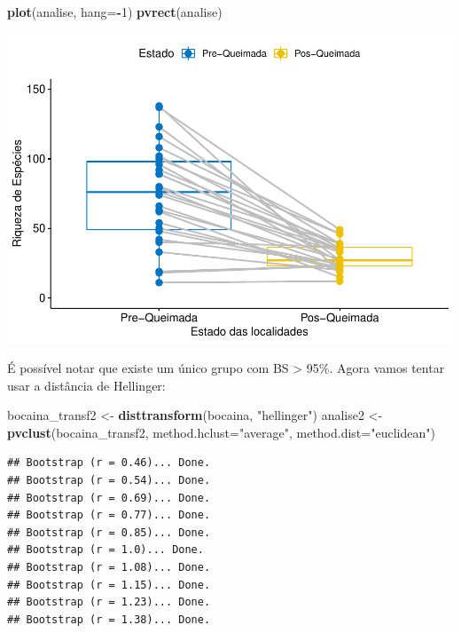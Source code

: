 \documentclass[
]{book}
\newenvironment{Shaded}{\begin{snugshade}}{\end{snugshade}}
\newcommand{\DataTypeTok}[1]{\textcolor[rgb]{0.13,0.29,0.53}{#1}}
\newcommand{\DecValTok}[1]{\textcolor[rgb]{0.00,0.00,0.81}{#1}}
\newcommand{\KeywordTok}[1]{\textcolor[rgb]{0.13,0.29,0.53}{\textbf{#1}}}
\newcommand{\NormalTok}[1]{#1}
\newcommand{\OperatorTok}[1]{\textcolor[rgb]{0.81,0.36,0.00}{\textbf{#1}}}
\newcommand{\StringTok}[1]{\textcolor[rgb]{0.31,0.60,0.02}{#1}}
\begin{document}
\begin{Shaded}
\begin{Highlighting}[]
\KeywordTok{plot}\NormalTok{(analise, }\DataTypeTok{hang=}\OperatorTok{-}\DecValTok{1}\NormalTok{)}
\KeywordTok{pvrect}\NormalTok{(analise)}
\end{Highlighting}
\end{Shaded}

\includegraphics{livro_r_ecologia_files/figure-latex/unnamed-chunk-6-1.pdf}

É possível notar que existe um único grupo com BS \textgreater{} 95\%. Agora vamos tentar usar a distância de Hellinger:

\begin{Shaded}
\begin{Highlighting}[]
\NormalTok{bocaina_transf2 <-}\StringTok{ }\KeywordTok{disttransform}\NormalTok{(bocaina, }\StringTok{"hellinger"}\NormalTok{)}
\NormalTok{analise2 <-}\StringTok{ }\KeywordTok{pvclust}\NormalTok{(bocaina_transf2, }\DataTypeTok{method.hclust=}\StringTok{"average"}\NormalTok{, }\DataTypeTok{method.dist=}\StringTok{"euclidean"}\NormalTok{) }
\end{Highlighting}
\end{Shaded}

\begin{verbatim}
## Bootstrap (r = 0.46)... Done.
## Bootstrap (r = 0.54)... Done.
## Bootstrap (r = 0.69)... Done.
## Bootstrap (r = 0.77)... Done.
## Bootstrap (r = 0.85)... Done.
## Bootstrap (r = 1.0)... Done.
## Bootstrap (r = 1.08)... Done.
## Bootstrap (r = 1.15)... Done.
## Bootstrap (r = 1.23)... Done.
## Bootstrap (r = 1.38)... Done.
\end{verbatim}
\end{document}
